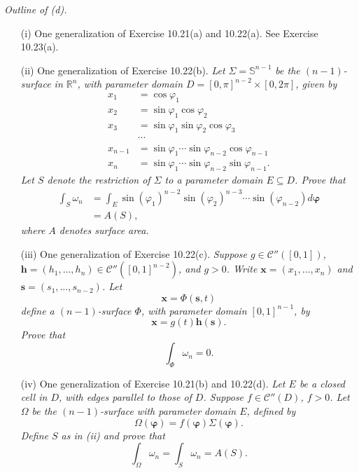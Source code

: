 \documentclass{article}
\begin{document}
\emph{Outline of (d).}
\begin{enumerate}
\item[(i)]
  One generalization of Exercise 10.21(a) and 10.22(a).
  See Exercise 10.23(a).

\item[(ii)]
  One generalization of Exercise 10.22(b).
  \emph{Let $\Sigma = \mathbb{S}^{n-1}$ be the $(n-1)$-surface in $\mathbb{R}^n$,
  with parameter domain $D = [0,\pi]^{n-2} \times [0,2\pi]$,
  given by
  \begin{align*}
    x_1 &= \cos\varphi_1 \\
    x_2 &= \sin\varphi_1 \cos\varphi_2 \\
    x_3 &= \sin\varphi_1 \sin\varphi_2 \cos\varphi_3 \\
    & \cdots \\
    x_{n-1} &= \sin\varphi_1 \cdots \sin\varphi_{n-2} \cos\varphi_{n-1} \\
    x_n &= \sin\varphi_1 \cdots \sin\varphi_{n-2} \sin\varphi_{n-1}.
  \end{align*}
  Let $S$ denote the restriction of $\Sigma$ to a parameter domain $E \subseteq D$.
  Prove that
  \begin{align*}
    \int_{S} \omega_n
    &= \int_{E}  \sin(\varphi_1)^{n-2} \sin(\varphi_2)^{n-3} \cdots \sin(\varphi_{n-2})
      d\bm{\varphi} \\
    &= A(S),
  \end{align*}
  where $A$ denotes surface area.}

\item[(iii)]
  One generalization of Exercise 10.22(c).
  \emph{Suppose $g \in \mathscr{C}''([0,1])$,
  $\mathbf{h} = (h_1, \ldots, h_{n}) \in \mathscr{C}''([0,1]^{n-2})$, and $g > 0$.
  Write
  $\mathbf{x} = (x_1,\ldots,x_n)$ and $\mathbf{s} = (s_1,\ldots,s_{n-2})$.
  Let
  \[
    \mathbf{x}
    = \Phi(\mathbf{s},t)
  \]
  define a $(n-1)$-surface $\Phi$, with parameter domain $[0,1]^{n-1}$, by
  \[
    \mathbf{x} = g(t)\mathbf{h}(\mathbf{s}).
  \]
  Prove that
  \[
    \int_{\Phi} \omega_n = 0.
  \]}

\item[(iv)]
  One generalization of Exercise 10.21(b) and 10.22(d).
  \emph{Let $E$ be a closed cell in $D$,
  with edges parallel to those of $D$.
  Suppose $f \in \mathscr{C}''(D)$, $f > 0$.
  Let $\Omega$ be the $(n-1)$-surface with parameter domain $E$,
  defined by
  \[
    \Omega(\bm{\varphi}) = f(\bm{\varphi}) \Sigma(\bm{\varphi}).
  \]
  Define $S$ as in (ii) and prove that
  \[
    \int_{\Omega} \omega_n = \int_{S} \omega_n = A(S).
  \]}


\end{enumerate}
\end{document}
